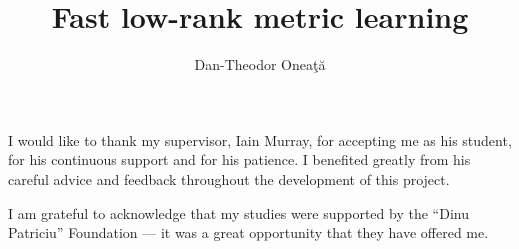 \documentclass[msc,ai,logo,notimes,twoside]{infthesis}  %
\title{Fast low-rank metric learning}
\author{Dan-Theodor Onea\c{t}\u{a}}
\begin{document}
\begin{preliminary}

\maketitle

\begin{acknowledgements}
I would like to thank my supervisor, Iain Murray, for accepting me as his student, for his continuous support and for his patience. I benefited greatly from his careful advice and feedback throughout the development of this project. 

I am grateful to acknowledge that my studies were supported by the ``Dinu Patriciu'' Foundation --- it was a great opportunity that they have offered me.
\end{acknowledgements}

\standarddeclaration


\tableofcontents

\listoffigures
\listoftables
\listofalgorithms

\end{preliminary}








\appendix


% 

%



\singlespace



\end{document}
